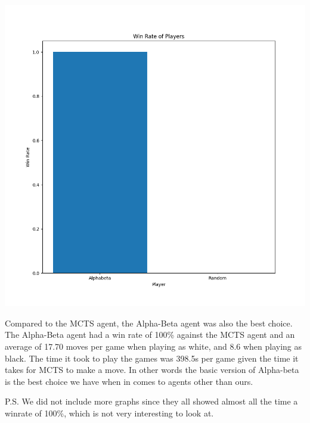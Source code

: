 \documentclass[11pt,a4paper]{report}
\begin{document}
\begin{answers}[20cm]
    
    \includegraphics[scale=.35]{graphs/abvsrand.png}


    Compared to the MCTS agent, the Alpha-Beta agent was also the best choice. The Alpha-Beta agent had a win rate of 100\% against the MCTS agent and an average of
    17.70 moves per game when playing as white, and 8.6 when playing as black. The time it took to play the games was 398.5s per game given the time it takes for MCTS to make a move. In other words the basic 
    version of Alpha-beta is the best choice we have when in comes to agents other than ours.

    P.S. We did not include more graphs since they all showed almost all the time a winrate of 100\%, which is not very interesting to look at.
    
\end{answers}
\end{document}
